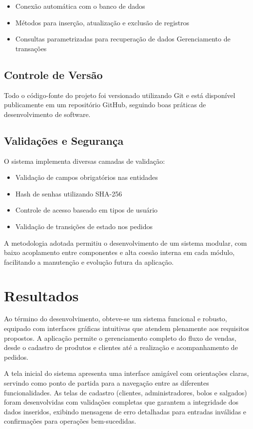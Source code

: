 \documentclass[conference]{IEEEtran}
\begin{document}
\begin{itemize}
    \item Conexão automática com o banco de dados
    \item Métodos para inserção, atualização e exclusão de registros
    \item Consultas parametrizadas para recuperação de dados
    \interface{} Gerenciamento de transações
\end{itemize}

\subsection{Controle de Versão}
Todo o código-fonte do projeto foi versionado utilizando Git e está disponível publicamente em um repositório GitHub, seguindo boas práticas de desenvolvimento de software.

\subsection{Validações e Segurança}
O sistema implementa diversas camadas de validação:

\begin{itemize}
    \item Validação de campos obrigatórios nas entidades
    \item Hash de senhas utilizando SHA-256
    \item Controle de acesso baseado em tipos de usuário
    \item Validação de transições de estado nos pedidos
\end{itemize}

A metodologia adotada permitiu o desenvolvimento de um sistema modular, com baixo acoplamento entre componentes e alta coesão interna em cada módulo, facilitando a manutenção e evolução futura da aplicação.

\section{Resultados}
Ao término do desenvolvimento, obteve-se um sistema funcional e robusto, equipado com interfaces gráficas intuitivas que atendem plenamente aos requisitos propostos. A aplicação permite o gerenciamento completo do fluxo de vendas, desde o cadastro de produtos e clientes até a realização e acompanhamento de pedidos.

A tela inicial do sistema apresenta uma interface amigável com orientações claras, servindo como ponto de partida para a navegação entre as diferentes funcionalidades. As telas de cadastro (clientes, administradores, bolos e salgados) foram desenvolvidas com validações completas que garantem a integridade dos dados inseridos, exibindo mensagens de erro detalhadas para entradas inválidas e confirmações para operações bem-sucedidas.
\end{document}

